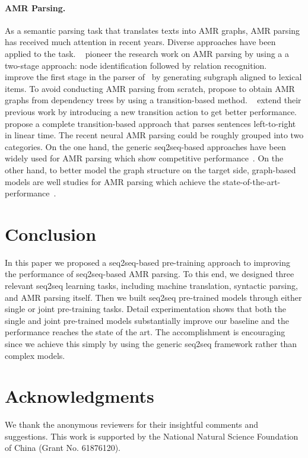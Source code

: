 \documentclass[11pt,a4paper]{article}
\newcommand{\ignore}[1]{}
\begin{document}
\paragraph{AMR Parsing.} As a semantic parsing task that translates texts into AMR graphs, AMR parsing has received much attention in recent years. Diverse approaches have been applied to the task. ~\citet{flanigan_etal_acl_2014} pioneer the research work on AMR parsing by using a a two-stage approach: node identification followed by relation recognition. ~\citet{werling_etal_acl_2015} improve the first stage in the parser of~\citet{flanigan_etal_acl_2014} by generating subgraph aligned to lexical items. To avoid conducting AMR parsing from scratch, \citet{wang_etal_naacl_2015} propose to obtain AMR graphs from dependency trees by using a transition-based method. ~\citet{wang_etal_acl_2015} extend their previous work by introducing a new transition action to get better performance. ~\citet{damonte_etal_eacl_2017} propose a complete transition-based approach that parses sentences left-to-right in linear time. The recent neural AMR parsing could be roughly grouped into two categories. On the one hand, the generic seq2seq-based approaches have been widely used for AMR parsing which show competitive performance~\cite{peng_etal_eacl_2017,noord_bos_2017,konstas_etal_acl_2017,ge_etal_ijcai_2019}. On the other hand, to better model the graph structure on the target side, graph-based models are well studies for AMR parsing which achieve the state-of-the-art-performance~\cite{lyu_titov_acl_2018,guo_lu_emnlp_2018,groschwitz_etal_acl_2018,zhang_etal_acl_2019,zhang_etal_emnlp_2019,cai_lam_acl_2020}. 


\section{Conclusion}
\label{sect:conclusion}
In this paper we proposed a seq2seq-based pre-training approach to improving the performance of seq2seq-based AMR parsing. To this end, we designed three relevant seq2seq learning tasks, including machine translation, syntactic parsing, and AMR parsing itself.  Then we built seq2seq pre-trained models through either single or joint pre-training tasks. Detail experimentation shows that both the single and joint pre-trained models substantially improve our baseline and the performance reaches the state of the art. The accomplishment is encouraging since we achieve this simply by using the generic seq2seq framework rather than complex models.

\section*{Acknowledgments}
We thank the anonymous reviewers for their insightful comments and suggestions. This work is supported by the National Natural Science Foundation of China (Grant No. 61876120)\ignore{, and the Priority Academic Program Development of Jiangsu Higher Education Institutions}.



\end{document}
